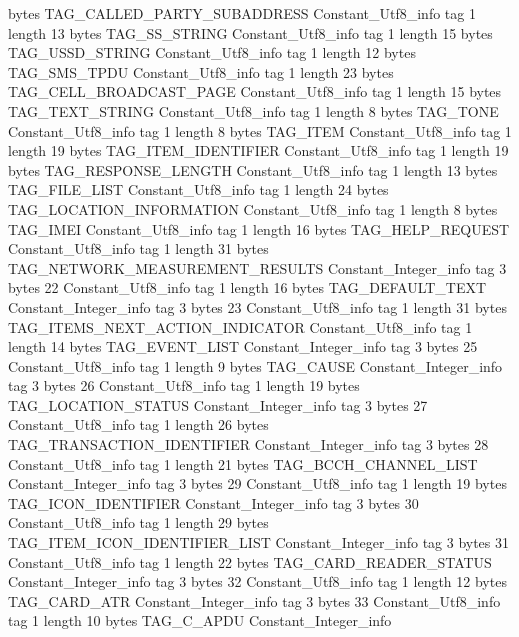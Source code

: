 {{{			bytes	TAG_CALLED_PARTY_SUBADDRESS
		}
		Constant_Utf8_info {
			tag	1
			length	13
			bytes	TAG_SS_STRING
		}
		Constant_Utf8_info {
			tag	1
			length	15
			bytes	TAG_USSD_STRING
		}
		Constant_Utf8_info {
			tag	1
			length	12
			bytes	TAG_SMS_TPDU
		}
		Constant_Utf8_info {
			tag	1
			length	23
			bytes	TAG_CELL_BROADCAST_PAGE
		}
		Constant_Utf8_info {
			tag	1
			length	15
			bytes	TAG_TEXT_STRING
		}
		Constant_Utf8_info {
			tag	1
			length	8
			bytes	TAG_TONE
		}
		Constant_Utf8_info {
			tag	1
			length	8
			bytes	TAG_ITEM
		}
		Constant_Utf8_info {
			tag	1
			length	19
			bytes	TAG_ITEM_IDENTIFIER
		}
		Constant_Utf8_info {
			tag	1
			length	19
			bytes	TAG_RESPONSE_LENGTH
		}
		Constant_Utf8_info {
			tag	1
			length	13
			bytes	TAG_FILE_LIST
		}
		Constant_Utf8_info {
			tag	1
			length	24
			bytes	TAG_LOCATION_INFORMATION
		}
		Constant_Utf8_info {
			tag	1
			length	8
			bytes	TAG_IMEI
		}
		Constant_Utf8_info {
			tag	1
			length	16
			bytes	TAG_HELP_REQUEST
		}
		Constant_Utf8_info {
			tag	1
			length	31
			bytes	TAG_NETWORK_MEASUREMENT_RESULTS
		}
		Constant_Integer_info {
			tag	3
			bytes	22
		}
		Constant_Utf8_info {
			tag	1
			length	16
			bytes	TAG_DEFAULT_TEXT
		}
		Constant_Integer_info {
			tag	3
			bytes	23
		}
		Constant_Utf8_info {
			tag	1
			length	31
			bytes	TAG_ITEMS_NEXT_ACTION_INDICATOR
		}
		Constant_Utf8_info {
			tag	1
			length	14
			bytes	TAG_EVENT_LIST
		}
		Constant_Integer_info {
			tag	3
			bytes	25
		}
		Constant_Utf8_info {
			tag	1
			length	9
			bytes	TAG_CAUSE
		}
		Constant_Integer_info {
			tag	3
			bytes	26
		}
		Constant_Utf8_info {
			tag	1
			length	19
			bytes	TAG_LOCATION_STATUS
		}
		Constant_Integer_info {
			tag	3
			bytes	27
		}
		Constant_Utf8_info {
			tag	1
			length	26
			bytes	TAG_TRANSACTION_IDENTIFIER
		}
		Constant_Integer_info {
			tag	3
			bytes	28
		}
		Constant_Utf8_info {
			tag	1
			length	21
			bytes	TAG_BCCH_CHANNEL_LIST
		}
		Constant_Integer_info {
			tag	3
			bytes	29
		}
		Constant_Utf8_info {
			tag	1
			length	19
			bytes	TAG_ICON_IDENTIFIER
		}
		Constant_Integer_info {
			tag	3
			bytes	30
		}
		Constant_Utf8_info {
			tag	1
			length	29
			bytes	TAG_ITEM_ICON_IDENTIFIER_LIST
		}
		Constant_Integer_info {
			tag	3
			bytes	31
		}
		Constant_Utf8_info {
			tag	1
			length	22
			bytes	TAG_CARD_READER_STATUS
		}
		Constant_Integer_info {
			tag	3
			bytes	32
		}
		Constant_Utf8_info {
			tag	1
			length	12
			bytes	TAG_CARD_ATR
		}
		Constant_Integer_info {
			tag	3
			bytes	33
		}
		Constant_Utf8_info {
			tag	1
			length	10
			bytes	TAG_C_APDU
		}
		Constant_Integer_info {
}}}
